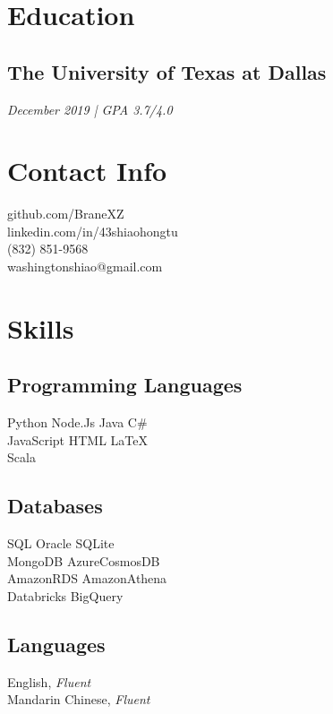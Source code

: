 \documentclass{fortythree_resume}
\begin{document}
\sectionsep

\begin{minipage}[t]{0.33\textwidth}

\section{Education}
\subsection{The University of Texas at Dallas}
\emph{December 2019 | GPA 3.7/4.0}
\sectionsep

\section{Contact Info}
\faGithub \hspace{0em} github.com/BraneXZ\\
\faLinkedinSquare \hspace{0em} linkedin.com/in/43shiaohongtu\\
\faMobile \hspace{.2em} (832) 851-9568\\
\faEnvelope \hspace{0em} washingtonshiao@gmail.com
\sectionsep

\section{Skills}
\subsection{Programming Languages}
Python \textbullet{} Node.Js \textbullet{} Java \textbullet{} C\# \\
JavaScript \textbullet{} HTML \textbullet{} \LaTeX \\
Scala
\subsection{Databases}
SQL \textbullet{} Oracle \textbullet{} SQLite\\ 
MongoDB \textbullet{} AzureCosmosDB \\
AmazonRDS \textbullet{}AmazonAthena \\
Databricks \textbullet{} BigQuery
\subsection{Languages}
English, \emph{Fluent}\\
Mandarin Chinese, \emph{Fluent}\\

\end{minipage}
\end{document}
